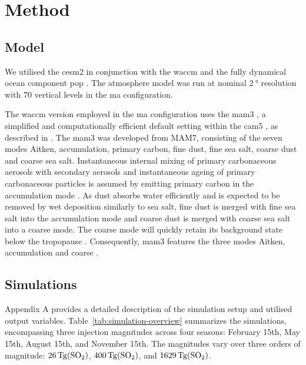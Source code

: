 \documentclass{ametsocV6.1}
\begin{document}
\section{Method}\label{sec:method}

\subsection{Model}

We utilised the \gls{cesm2} \citep{danabasoglu2020} in conjunction with the \gls{waccm}
\citep{gettleman2019} and the fully dynamical ocean component \gls{pop}
\citep{smith2010, danabasoglu2020}. The atmosphere model was run at nominal
\(\SI{2}{\degree}\) resolution with \(70\) vertical levels in the \gls{ma}
configuration.

The \gls{waccm} version employed in the \gls{ma} configuration uses the \gls{mam3}
\citep{gettleman2019}, a simplified and computationally efficient default setting within
the \gls{cam5} \citep{liu2016}, as described in \citet{liu2012}. The \gls{mam3} was
developed from MAM7, consisting of the seven modes Aitken, accumulation, primary carbon,
fine dust, fine sea salt, coarse dust and coarse sea salt. Instantaneous internal mixing
of primary carbonaceous aerosols with secondary aerosols and instantaneous ageing of
primary carbonaceous particles is assumed by emitting primary carbon in the accumulation
mode \citep{liu2016}. 
As dust absorbs water efficiently and is expected to be removed by wet deposition similarly to sea salt, fine dust is merged with fine sea salt into the accumulation mode and coarse dust is merged with coarse sea salt into a coarse mode. 
The coarse mode will quickly retain its background state below the tropopause \citep{liu2012}. Consequently, \gls{mam3} features the three modes
Aitken, accumulation and coarse \citep{liu2016}.

\subsection{Simulations}

Appendix A provides a detailed description of the simulation setup and utilised output
variables. Table~\ref{tab:simulation-overview} summarizes the simulations, encompassing
three  injection magnitudes across four seasons: February 15th, May 15th, August
15th, and November 15th. The magnitudes vary over three orders of magnitude:
\(\SI{26}{\tera\gram(\ce{SO2})}\), \(\SI{400}{\tera\gram(\ce{SO2})}\), and
\(\SI{1629}{\tera\gram(\ce{SO2})}\).
\end{document}
